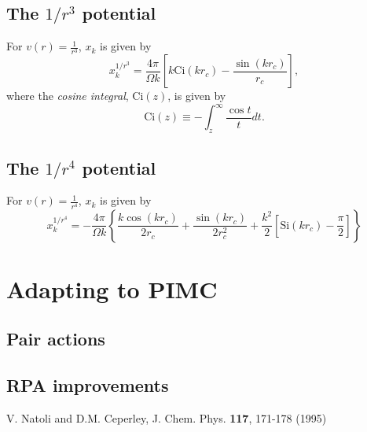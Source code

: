 \documentclass{article}
\begin{document}
\subsection{The $1/r^3$ potential}
For $v(r) = \frac{1}{r^3}$, $x_k$ is given by
\begin{equation}
x_k^{1/r^3} = \frac{4\pi}{\Omega k} 
\left[k\text{Ci}(k r_c) - \frac{\sin(k r_c)}{r_c} \right],
\end{equation}
where the {\em cosine integral}, $\text{Ci}(z)$, is given by
\begin{equation}
\text{Ci}(z) \equiv -\int_z^\infty \frac{\cos t}{t} dt.
\end{equation}

\subsection{The $1/r^4$ potential}
For $v(r) = \frac{1}{r^4}$, $x_k$ is given by
\begin{equation}
x_k^{1/r^4} = -\frac{4 \pi}{\Omega k} 
\left\{
\frac{k \cos(k r_c)}{2 r_c} + \frac{\sin(k r_c)}{2r_c^2} + \frac{k^2}{2} \left[ \text{Si}(k r_c) - \frac{\pi}{2}\right]\right\}
\end{equation}


\section{Adapting to PIMC}
\subsection{Pair actions}
\subsection{RPA improvements}

\begin{thebibliography}{9}
   V. Natoli and D.M. Ceperley, J. Chem. Phys. {\bf
  117}, 171-178 (1995)
\end{thebibliography}
\end{document}
